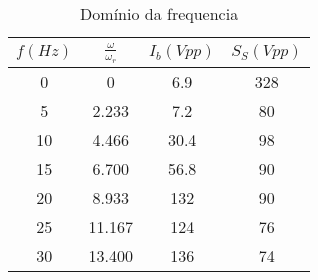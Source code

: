 \begin{table}[H]
\centering
\begin{tabular}{|c|c|c|c|}
\hline
$f(Hz)$ &$\frac{\omega}{\omega_r}$& $I_b (Vpp)$ & $S_S (Vpp)$   \\
\hline
0 & 0 & 6.9 & 328\\
\hline
5 &2.233 &7.2 &80 \\
\hline
10 &4.466 &30.4 &98 \\
\hline
15 &6.700 &56.8 &90 \\
\hline
20 &8.933 &132 &90 \\
\hline
25 &11.167 &124 &76  \\
\hline
30 &13.400 &136 &74  \\
\hline
\end{tabular}
\caption{Domínio da frequencia}
\label{tab:ch1-freq1}
\end{table}



